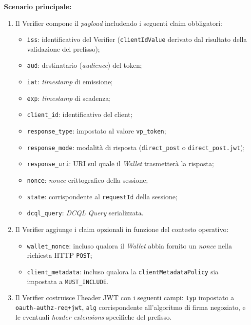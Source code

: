 \noindent\textbf{Scenario principale:}
\begin{enumerate}
    \item Il Verifier compone il \textit{payload} includendo i seguenti claim obbligatori:
    \begin{itemize}
        \item \texttt{iss}: identificativo del Verifier (\texttt{clientIdValue} derivato dal risultato della validazione del prefisso);
        \item \texttt{aud}: destinatario (\textit{audience}) del token;
        \item \texttt{iat}: \textit{timestamp} di emissione;
        \item \texttt{exp}: \textit{timestamp} di scadenza;
        \item \texttt{client\_\allowbreak{}id}: identificativo del client;
        \item \texttt{response\_\allowbreak{}type}: impostato al valore \texttt{vp\_\allowbreak{}token};
        \item \texttt{response\_\allowbreak{}mode}: modalità di risposta (\texttt{direct\_\allowbreak{}post} o \texttt{direct\_\allowbreak{}post.jwt});
        \item \texttt{response\_\allowbreak{}uri}: URI sul quale il \textit{Wallet} trasmetterà la risposta;
        \item \texttt{nonce}: \textit{nonce} crittografico della sessione;
        \item \texttt{state}: corrispondente al \texttt{requestId} della sessione;
        \item \texttt{dcql\_\allowbreak{}query}: \textit{DCQL Query} serializzata.
    \end{itemize}
    \item Il Verifier aggiunge i claim opzionali in funzione del contesto operativo:
    \begin{itemize}
        \item \texttt{wallet\_\allowbreak{}nonce}: incluso qualora il \textit{Wallet} abbia fornito un \textit{nonce} nella richiesta HTTP \texttt{POST};
        \item \texttt{client\_\allowbreak{}metadata}: incluso qualora la \texttt{clientMetadataPolicy} sia impostata a \texttt{MUST\_\allowbreak{}INCLUDE}.
    \end{itemize}
    \item Il Verifier costruisce l'header JWT con i seguenti campi: \texttt{typ} impostato a \texttt{oauth-\allowbreak{}authz-\allowbreak{}req+jwt}, \texttt{alg} corrispondente all'algoritmo di firma negoziato, e le eventuali \textit{header extensions} specifiche del prefisso.
\end{enumerate}

